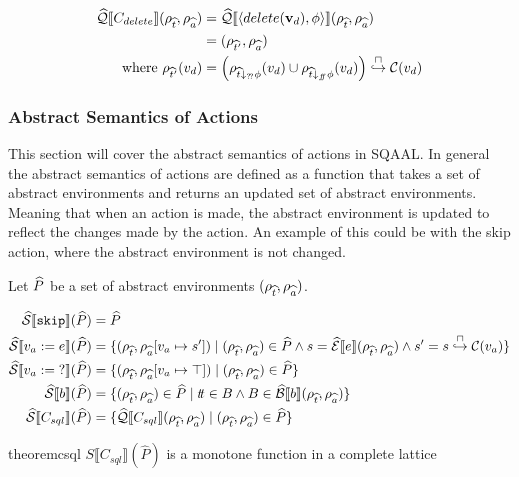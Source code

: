 \begin{align*}
    \widehat{\mathcal{Q}}\llbracket C_{delete} \rrbracket(\rho_{\widehat{t}}, \rho_{\widehat{a}})
    &= \widehat{\mathcal{Q}}\llbracket \langle delete(\mathbf{v}_d), \phi \rangle \rrbracket (\rho_{\widehat{t}}, \rho_{\widehat{a}}) \\
    &= (\rho_{\widehat{t}'}, \rho_{\widehat{a}}) \\
    \text{where } \rho_{\widehat{t}'}(v_d) &= \left( \rho_{\widehat{t} \downarrow_{?\!?} \phi}(v_d) \cup \rho_{\widehat{t} \downarrow_{f\!\!f} \phi}(v_d) \right) \overset{\sqcap}{\hookrightarrow} \mathcal{C}(v_d)
\end{align*}

\subsubsection{Abstract Semantics of Actions}
This section will cover the abstract semantics of actions in SQAAL.
In general the abstract semantics of actions are defined as a function that takes a set of abstract environments and returns an updated set of abstract environments.
Meaning that when an action is made, the abstract environment is updated to reflect the changes made by the action.
An example of this could be with the skip action, where the abstract environment is not changed.


Let $\widehat{P}$ be a set of abstract environments $(\rho_{\widehat{t}}, \rho_{\widehat{a}})$.

\begin{align}
    \widehat{\mathcal{S}} \llbracket \texttt{skip} \rrbracket(\widehat{P}) &= \widehat{P} \\
    \widehat{\mathcal{S}} \llbracket v_a := e \rrbracket(\widehat{P}) &= \{(\rho_{\widehat{t}}, \rho_{\widehat{a}}[v_a \mapsto s']) \mid (\rho_{\widehat{t}}, \rho_{\widehat{a}}) \in \widehat{P} \land s = \widehat{\mathcal{E}}\llbracket e \rrbracket(\rho_{\widehat{t}}, \rho_{\widehat{a}}) \land s' = s \overset{\sqcap}{\hookrightarrow} \mathcal{C}(v_a) \} \\
    \widehat{\mathcal{S}} \llbracket v_a := \; ? \rrbracket(\widehat{P}) &= \{(\rho_{\widehat{t}}, \rho_{\widehat{a}}[v_a \mapsto \top]) \mid (\rho_{\widehat{t}}, \rho_{\widehat{a}}) \in \widehat{P} \} \\
    \widehat{\mathcal{S}} \llbracket b \rrbracket(\widehat{P}) &= \{ (\rho_{\widehat{t}}, \rho_{\widehat{a}}) \in \widehat{P} \mid t\!t \in B \land B \in \widehat{\mathcal{B}}\llbracket b \rrbracket(\rho_{\widehat{t}}, \rho_{\widehat{a}}) \} \\
    \widehat{\mathcal{S}} \llbracket C_{sql} \rrbracket(\widehat{P}) &= \{\widehat{\mathcal{Q}}\llbracket C_{sql} \rrbracket(\rho_{\widehat{t}}, \rho_{\widehat{a}}) \mid (\rho_{\widehat{t}}, \rho_{\widehat{a}}) \in \widehat{P} \}
\end{align}

\begin{restatable}{theorem}{csql}\label{thm:csql}
    $S\llbracket C_{sql}\rrbracket(\widehat{P})$ is a monotone function in a complete lattice
\end{restatable}

